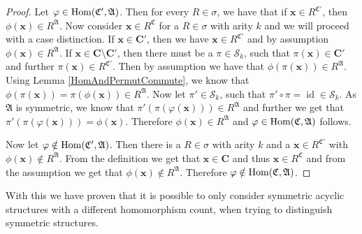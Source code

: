\begin{proof}
	Let $\varphi\in \operatorname{Hom}(\mathfrak C',\mathfrak A)$.
	Then for every $R\in \sigma$, we have that if $\mathbf x\in R^{\mathfrak C'}$, then $\phi(\mathbf x)\in R^{\mathfrak A}$.
	Now consider $\mathbf x\in R^{\mathfrak C}$ for a $R\in \sigma$ with arity $k$ and we will proceed with a case distinction.
	If $\mathbf x\in \mathbf{C'}$, then we have $\mathbf x\in R^{\mathfrak C'}$ and by assumption $\phi(\mathbf x)\in R^{\mathfrak A}$.
	If $\mathbf x\in \mathbf C\setminus\mathbf{C'}$, then there must be a $\pi\in \mathcal S_k$, such that $\pi(\mathbf x)\in \mathbf{C'}$ and further $\pi(\mathbf x)\in R^{\mathfrak C'}$.
	Then by assumption we have that $\phi(\pi(\mathbf x))\in R^{\mathfrak A}$.
	Using Lemma \ref{HomAndPermutCommute}, we know that $\phi(\pi(\mathbf x))=\pi(\phi(\mathbf x))\in R^{\mathfrak A}$.
	Now let $\pi'\in \mathcal S_k$, such that $\pi'\circ\pi=\operatorname{id}\in \mathcal S_k$.
	As $\mathfrak A$ is symmetric, we know that $\pi'(\pi(\varphi(\mathbf x)))\in R^{\mathfrak A}$ and further we get that $\pi'(\pi(\varphi(\mathbf x)))=\phi(\mathbf x)$.
	Therefore $\phi(\mathbf x)\in R^{\mathfrak A}$ and $\varphi\in\operatorname{Hom}(\mathfrak C,\mathfrak A)$ follows.
	
	Now let $\varphi\notin\operatorname{Hom}(\mathfrak C',\mathfrak A)$.
	Then there is a $R\in\sigma$ with arity $k$ and a $\mathbf x\in R^{\mathfrak C'}$ with $\phi(\mathbf x)\notin R^{\mathfrak A}$.
	From the definition we get that $\mathbf x\in \mathbf{C}$ and thus $\mathbf x \in R^{\mathfrak C}$ and from the assumption we get that $\phi(\mathbf x)\notin R^{\mathfrak A}$.
	Therefore $\varphi\notin \operatorname{Hom}(\mathfrak C,\mathfrak A)$.
\end{proof}

With this we have proven that it is possible to only consider symmetric acyclic structures with a different homomorphism count, when trying to distinguish symmetric structures.



